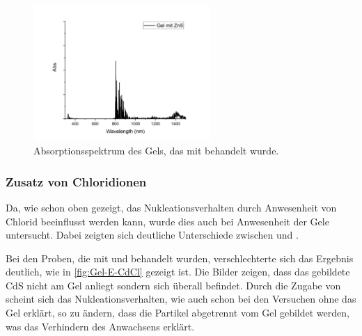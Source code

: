 		\begin{figure}[H]
			\centering
			\includegraphics[width=0.6\textwidth]{Bilder/UV-Gel-E-ZnS} 	
			\caption{Absorptionsspektrum des Gels, das mit  behandelt wurde.}
			\label{fig:UV-Gel-E-ZnS}
		\end{figure}
	
	\subsubsection{Zusatz von Chloridionen}
	
		Da, wie schon oben gezeigt, das Nukleationsverhalten durch Anwesenheit von Chlorid beeinflusst werden kann, wurde dies auch bei Anwesenheit der Gele untersucht.
		Dabei zeigten sich deutliche Unterschiede zwischen  und .
		
		Bei den Proben, die mit  und  behandelt wurden, verschlechterte sich das Ergebnis deutlich, wie in \cref{fig:Gel-E-CdCl} gezeigt ist.
		Die Bilder zeigen, dass das gebildete CdS nicht am Gel anliegt sondern sich überall befindet.
		Durch die Zugabe von  scheint sich das Nukleationsverhalten, wie auch schon bei den Versuchen ohne das Gel erklärt, so zu ändern, dass die Partikel abgetrennt vom Gel gebildet werden, was das Verhindern des Anwachsens erklärt.  
		
